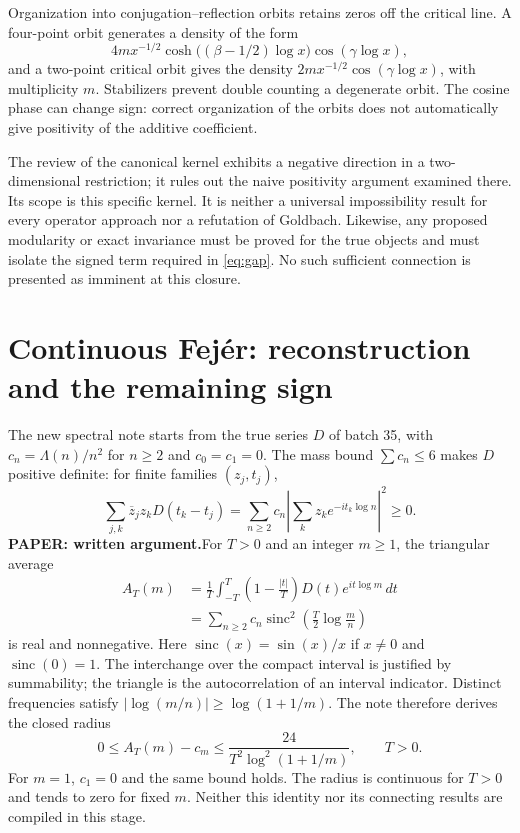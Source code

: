 \documentclass[11pt,a4paper]{article}
\theoremstyle{remark}
\newcommand{\Lam}{\Lambda}
\newcommand{\paper}{\textbf{PAPER: written argument.}\space}
\begin{document}
Organization into conjugation--reflection orbits retains zeros off
the critical line. A four-point orbit generates a density
of the form
\[
4m x^{-1/2}\cosh\bigl((\beta-1/2)\log x\bigr)
\cos(\gamma\log x),
\]
and a two-point critical orbit gives the density
$2m x^{-1/2}\cos(\gamma\log x)$, with multiplicity $m$.
Stabilizers prevent double counting a degenerate orbit.
The cosine phase can change sign: correct organization of the
orbits does not automatically give positivity of the additive coefficient.

The review of the canonical kernel exhibits a negative direction in a
two-dimensional restriction; it rules out the naive positivity argument
examined there. Its scope is this specific kernel. It is neither a
universal impossibility result for every operator approach nor a
refutation of Goldbach. Likewise, any proposed modularity or exact
invariance must be proved for the true objects and must
isolate the signed term required in \eqref{eq:gap}. No such
sufficient connection is presented as imminent at this closure.

\clearpage
\section{Continuous Fej\'er: reconstruction and the remaining sign}\label{sec:fejer}
The new spectral note starts from the true series $D$ of batch 35, with
$c_n=\Lam(n)/n^2$ for $n\ge2$ and $c_0=c_1=0$.
The mass bound $\sum c_n\le6$ makes $D$ positive definite: for finite
families $(z_j,t_j)$,
\[
\sum_{j,k}\overline z_jz_kD(t_k-t_j)
=\sum_{n\ge2}c_n\left|\sum_k z_ke^{-it_k\log n}\right|^2\ge0.
\]
\paper For $T>0$ and an integer $m\ge1$, the triangular average
\begin{equation}\label{eq:fejer-cont}
\begin{split}
A_T(m)&=\frac1T\int_{-T}^{T}\left(1-\frac{|t|}{T}\right)
D(t)e^{it\log m}\,dt\\
&=\sum_{n\ge2}c_n\operatorname{sinc}^2\!\left(\frac T2\log\frac mn\right)
\end{split}
\end{equation}
is real and nonnegative. Here $\operatorname{sinc}(x)=\sin(x)/x$ if
$x\ne0$ and $\operatorname{sinc}(0)=1$. The interchange over the compact interval is
justified by summability; the triangle is the autocorrelation of an
interval indicator. Distinct frequencies satisfy
$|\log(m/n)|\ge\log(1+1/m)$. The note therefore derives the closed radius
\begin{equation}\label{eq:fejer-radius}
0\le A_T(m)-c_m\le
\frac{24}{T^2\log^2(1+1/m)},\qquad T>0.
\end{equation}
For $m=1$, $c_1=0$ and the same bound holds. The radius is continuous
for $T>0$ and tends to zero for fixed $m$. Neither this identity nor its
connecting results are compiled in this stage.
\end{document}
